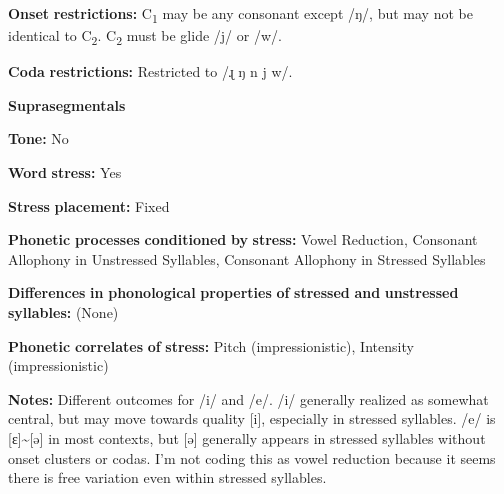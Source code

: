 \begin{styleBody}
\textbf{Onset} \textbf{restrictions:} C\textsubscript{1} may be any consonant except /ŋ/, but may not be identical to C\textsubscript{2}. C\textsubscript{2} must be glide /j/ or /w/. 
\end{styleBody}

\begin{styleBody}
\textbf{Coda} \textbf{restrictions:} Restricted to /ɻ ŋ n j w/.
\end{styleBody}

\begin{styleBody}
\textbf{Suprasegmentals}
\end{styleBody}

\begin{styleBody}
\textbf{Tone:} No
\end{styleBody}

\begin{styleBody}
\textbf{Word} \textbf{stress:} Yes
\end{styleBody}

\begin{styleBody}
\textbf{Stress} \textbf{placement:} Fixed
\end{styleBody}

\begin{styleBody}
\textbf{Phonetic} \textbf{processes} \textbf{conditioned} \textbf{by} \textbf{stress:} Vowel Reduction, Consonant Allophony in Unstressed Syllables, Consonant Allophony in Stressed Syllables
\end{styleBody}

\begin{styleBody}
\textbf{Differences} \textbf{in} \textbf{phonological} \textbf{properties} \textbf{of} \textbf{stressed} \textbf{and} \textbf{unstressed} \textbf{syllables:} (None)
\end{styleBody}

\begin{styleBody}
\textbf{Phonetic} \textbf{correlates} \textbf{of} \textbf{stress:} Pitch (impressionistic), Intensity (impressionistic)
\end{styleBody}

\begin{styleBody}
\textbf{Notes:} Different outcomes for /i/ and /e/. /i/ generally realized as somewhat central, but may move towards quality [i], especially in stressed syllables. /e/ is [ɛ]{\textasciitilde}[ə] in most contexts, but [ə] generally appears in stressed syllables without onset clusters or codas. I’m not coding this as vowel reduction because it seems there is free variation even within stressed syllables.
\end{styleBody}

